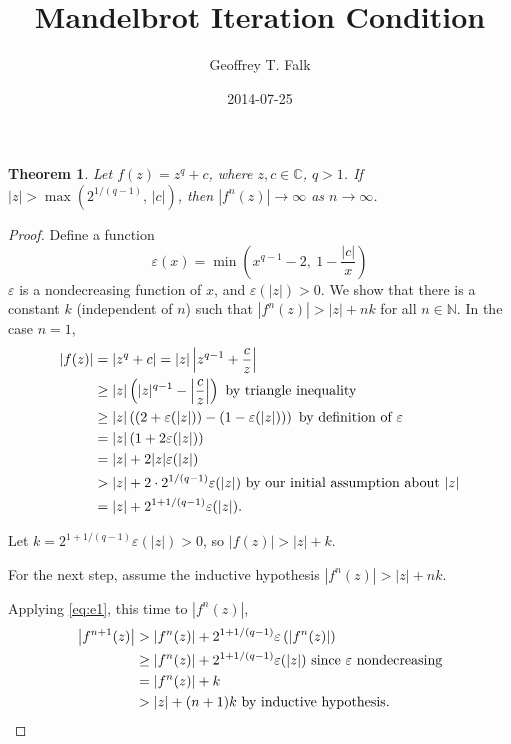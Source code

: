 \documentclass[11pt]{article}
\date{2014-07-25}
\author{Geoffrey T. Falk}
\title{Mandelbrot Iteration Condition}
\begin{document}

\maketitle

\newtheorem*{theorem}{Theorem}

\begin{theorem}
Let \( f(z) = z^q + c \), where \( z, c \in \mathbb{C} \), \( q > 1 \).
If \( |z| > \max\left(2^{1/(q-1)},\, |c|\right) \), then
\( |f^n(z)| \rightarrow \infty \) as \( n \rightarrow \infty \).
\end{theorem}

\begin{proof}
Define a function
\[
\varepsilon(x) = \min\left(x^{q-1} - 2,\ 1 - \frac{|c|}{x}\right)
\]
\( \varepsilon \) is a nondecreasing function of \( x \), and \( \varepsilon(|z|) > 0 \).
We show that there is a constant \( k \) (independent of \( n \)) such that
\( |f^n(z)| > |z| + n k \) for all \( n \in \mathbb{N} \). In the case \( n = 1 \),
\begin{equation} \label{eq:e1}
\begin{aligned}
|f(z)| &= \left| z^q + c \right| = |z| \left| z^{q-1} + \frac{c}{z} \right| \\
&\geq |z| \left( |z|^{q-1} - {\left|\frac{c}{z}\right|} \right) \text{ by triangle inequality} \\
&\geq |z| \left( \left(2 + \varepsilon(|z|) \right) - \left(1 - \varepsilon(|z|)\right) \right)
 \text{ by definition of \( \varepsilon \)} \\
&= |z| \left(1 + 2 \varepsilon(|z|) \right) \\
&= |z| + 2 |z| \varepsilon(|z|) \\
&> |z| + 2 \cdot 2^{{1/(q-1)}} \varepsilon(|z|) \text{ by our initial assumption about } |z| \\
&= |z| + 2^{1 + {1/(q-1)}} \varepsilon(|z|).
\end{aligned}
\end{equation}

Let \( k = 2^{1 + {1/(q-1)}} \varepsilon(|z|) > 0 \), so \( |f(z)| > |z| + k \).
\parskip 6pt

For the next step, assume the inductive hypothesis \( |f^n(z)| > |z| + n k \).

Applying \eqref{eq:e1}, this time to \( |f^n(z)| \),
\begin{equation} \label{eq:e2}
\begin{aligned}
\left|f^{n+1}(z)\right| 
&> \left|f^n(z)\right| +  2^{1 + {1/(q-1)}} \varepsilon\left( \left|f^n(z)\right| \right) \\
&\geq \left|f^n(z)\right| + 2^{1 + {1/(q-1)}} \varepsilon(|z|) \text{ since \( \varepsilon \) nondecreasing} \\
&= \left|f^n(z)\right| + k \\
&> |z| + (n+1)k \text{ by inductive hypothesis.}
\end{aligned}
\end{equation}
\end{proof}
\end{document}
